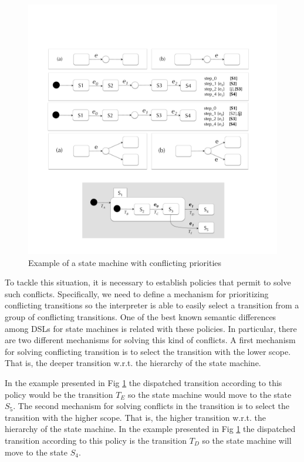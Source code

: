 \documentclass[preprint,5p]{elsarticle}
\begin{document}
\begin{figure}[h!]
	\centering
	\includegraphics[width=1\linewidth]{images/conflicting-priorities.pdf}
	\caption{Example of a state machine with conflicting priorities}
	\label{fig:conflicting-priorities}
\end{figure}

To tackle this situation, it is necessary to establish policies that permit to solve such conflicts. Specifically, we need to define a mechanism for prioritizing conflicting transitions so the interpreter is able to easily select a transition from a group of conflicting transitions. One of the best known semantic differences among DSLs for state machines is related with these policies. In particular, there are two different mechanisms for solving this kind of conflicts. A first mechanism for solving conflicting transition is to select the transition with the lower scope. That is, the deeper transition w.r.t. the hierarchy of the state machine.

In the example presented in Fig \ref{fig:conflicting-priorities} the dispatched transition according to this policy would be the transition $T_E$ so the state machine would move to the state $S_5$. The second mechanism for solving conflicts in the transition is to select the transition with the higher scope. That is, the higher transition w.r.t. the hierarchy of the state machine. In the example presented in Fig \ref{fig:conflicting-priorities} the dispatched transition according to this policy is the transition $T_D$ so the state machine will move to the state $S_4$.
\end{document}
